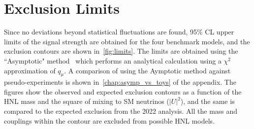 \begin{table}[!htbp]
    \centering
    \caption{Percentage impact of uncertainties on the measured signal strength $\hat{\mu}$ for the 2QDH(IH) HNL model for representative mass and proper lifetimes at the edges and in the bulk of the sensitivity.}
    \label{tab:uncertainty}
\end{table}

\section{Exclusion Limits}\label{sec:limits}

Since no deviations beyond statistical fluctuations are found, 95\% CL upper limits of the signal strength are obtained for the four benchmark models, and the exclusion contours are shown in~\cref{fig:limits}. The limits are obtained using the ``Asymptotic" method~\cite{Cowan:2010js} which performs an analytical calculation using a $\chi^2$ approximation of $q_{\mu}$. A comparison of using the Aymptotic method against pseudo-experiments is shown in~\cref{chap:asymp_vs_toys} of the appendix. The figures show the observed and expected exclusion contours as a function of the HNL mass and the square of mixing to SM neutrinos ($|U|^2$), and the same is compared to the expected exclusion from the 2022 analysis. All the mass and couplings within the contour are excluded from possible HNL models.

